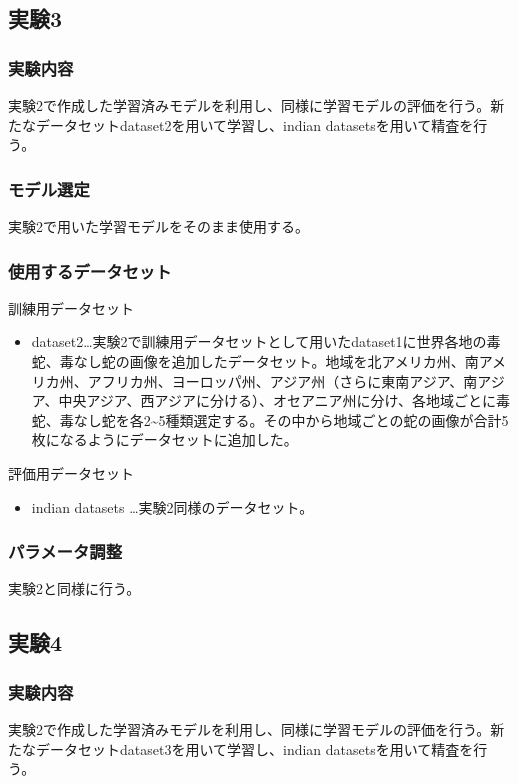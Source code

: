 \documentclass[a4paper, 11pt, titlepage]{jsarticle}
\begin{document}
\subsection{実験3}
\subsubsection{実験内容}
実験2で作成した学習済みモデルを利用し、同様に学習モデルの評価を行う。新たなデータセットdataset2を用いて学習し、indian datasetsを用いて精査を行う。

\subsubsection{モデル選定}
実験2で用いた学習モデルをそのまま使用する。

\subsubsection{使用するデータセット}
訓練用データセット
\begin{itemize}
\item dataset2…実験2で訓練用データセットとして用いたdataset1に世界各地の毒蛇、毒なし蛇の画像を追加したデータセット。地域を北アメリカ州、南アメリカ州、アフリカ州、ヨーロッパ州、アジア州（さらに東南アジア、南アジア、中央アジア、西アジアに分ける）、オセアニア州に分け、各地域ごとに毒蛇、毒なし蛇を各2\textasciitilde5種類選定する。その中から地域ごとの蛇の画像が合計5枚になるようにデータセットに追加した。
\end{itemize}\par
評価用データセット
\begin{itemize}
\item indian datasets …実験2同様のデータセット。
\end{itemize}

\subsubsection{パラメータ調整}
実験2と同様に行う。

\subsection{実験4}
\subsubsection{実験内容}
実験2で作成した学習済みモデルを利用し、同様に学習モデルの評価を行う。新たなデータセットdataset3を用いて学習し、indian datasetsを用いて精査を行う。
\end{document}
